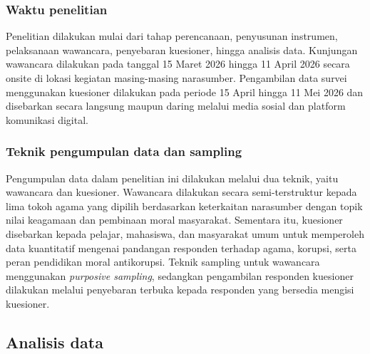 \subsubsection{Waktu penelitian}
Penelitian dilakukan mulai dari tahap perencanaan, penyusunan instrumen, pelaksanaan wawancara, penyebaran kuesioner, hingga analisis data. Kunjungan wawancara dilakukan pada tanggal 15 Maret 2026 hingga 11 April 2026 secara onsite di lokasi kegiatan masing-masing narasumber. Pengambilan data survei menggunakan kuesioner dilakukan pada periode 15 April hingga 11 Mei 2026 dan disebarkan secara langsung maupun daring melalui media sosial dan platform komunikasi digital.

\subsubsection{Teknik pengumpulan data dan sampling}

Pengumpulan data dalam penelitian ini dilakukan melalui dua teknik, yaitu wawancara dan kuesioner. Wawancara dilakukan secara semi-terstruktur kepada lima tokoh agama yang dipilih berdasarkan keterkaitan narasumber dengan topik nilai keagamaan dan pembinaan moral masyarakat. Sementara itu, kuesioner disebarkan kepada pelajar, mahasiswa, dan masyarakat umum untuk memperoleh data kuantitatif mengenai pandangan responden terhadap agama, korupsi, serta peran pendidikan moral antikorupsi. Teknik sampling untuk wawancara menggunakan \textit{purposive sampling}, sedangkan pengambilan responden kuesioner dilakukan melalui penyebaran terbuka kepada responden yang bersedia mengisi kuesioner.

\subsection{Analisis data}

